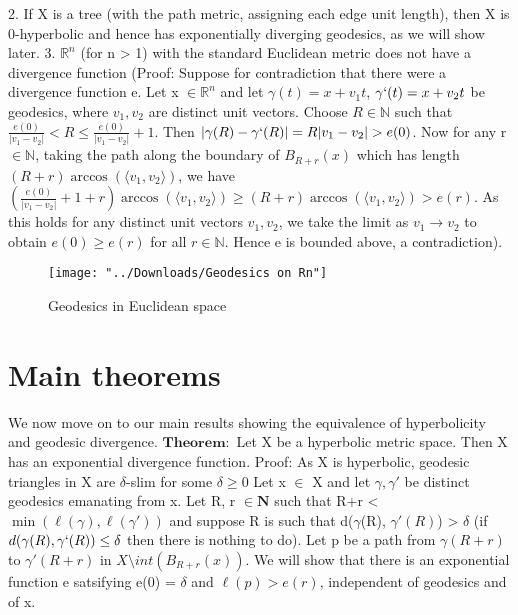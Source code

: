 \documentclass[11pt]{article}
\newcommand{\vs}{\vskip10pt}
\begin{document}
	
	\vs
	2. If X is a tree (with the path metric, assigning each edge unit length), then X is 0-hyperbolic and hence has exponentially diverging geodesics, as we will show later.
	\vs
	3. $\mathbb{R}^n$ (for n > 1) with the standard Euclidean metric does not have a divergence function (Proof: Suppose for contradiction that there were a divergence function e. Let x $\in \mathbb{R}^n$ and let $\gamma(t) = x + v_1t$, $\gamma`(t) = x + v_2t$ be geodesics, where $v_1, v_2 $ are distinct unit vectors. Choose $R \in \mathbb{N}$ such that $\frac{e(0)}{\vert v_1 - v_2 \vert } < R \leq \frac{e(0)}{\vert v_1 - v_2 \vert } + 1$. Then $\vert \gamma(R) - \gamma`(R) \vert = R \vert v_1 - v_2 \vert > e(0)$. Now for any r $\in \mathbb{N}$, taking the path along the boundary of $B_{R+r}(x)$ which has length $(R+r) \arccos(\langle v_1, v_2 \rangle)$, we have $(\frac{e(0)}{\vert v_1 - v_2 \vert} + 1 + r)\arccos(\langle v_1, v_2 \rangle) \geq (R+r)\arccos(\langle v_1, v_2 \rangle) > e(r)$. As this holds for any distinct unit vectors $v_1, v_2$, we take the limit as $v_1 \rightarrow v_2$ to obtain $e(0) \geq e(r)$ for all $r \in \mathbb{N}$. Hence e is bounded above, a contradiction). 
	
		\begin{figure}[h]
		\centering
		\texttt{[image: "../Downloads/Geodesics on Rn"]}
		\caption{Geodesics in Euclidean space}
		\label{Figure 3: Geodesics in Euclidean space}
		
	\end{figure}
	
	\vskip80pt
	\section{Main theorems}
	
	We now move on to our main results showing the equivalence of hyperbolicity and geodesic divergence. 
	\vs
	$\mathbf{Theorem: }$ Let X be a hyperbolic metric space. Then X has an exponential divergence function. 
	\vs 
	Proof: As X is hyperbolic, geodesic triangles in X are $\delta $-slim for some $\delta \geq 0$ Let x $\in $ X and let $\gamma, \gamma'$ be distinct geodesics emanating from x. Let R, r $\in \mathbf{N}$ such that R+r < $\min(\ell(\gamma), \ell(\gamma'))$ and suppose R is such that d($\gamma$(R), $\gamma'(R)$) > $\delta$ (if $d(\gamma(R), \gamma`(R)) \leq \delta$ then there is nothing to do). Let p be a path from $\gamma(R+r)$ to $\gamma'(R+r)$ in $X \setminus int(B_{R+r}(x))$. We will show that there is an exponential function e satsifying e(0) = $\delta$ and $\ell(p) > e(r)$, independent of geodesics and of x. 
	
\end{document}
